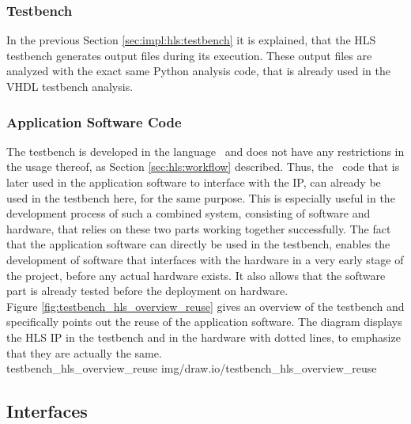 \subsubsection{Testbench}

In the previous Section \ref{sec:impl:hls:testbench} it is explained, that the HLS testbench generates output files during its execution.
These output files are analyzed with the exact same Python analysis code, that is already used in the VHDL testbench analysis.

\subsubsection{Application Software Code}

The testbench is developed in the language \cplusplus\ and does not have any restrictions in the usage thereof, as Section \ref{sec:hls:workflow} described.
Thus, the \cplusplus\ code that is later used in the application software to interface with the IP, can already be used in the testbench here, for the same purpose.
This is especially useful in the development process of such a combined system, consisting of software and hardware, that relies on these two parts working together successfully.
The fact that the application software can directly be used in the testbench, enables the development of software that interfaces with the hardware in a very early stage of the project, before any actual hardware exists.
It also allows that the software part is already tested before the deployment on hardware.\\

Figure \ref{fig:testbench_hls_overview_reuse} gives an overview of the testbench and specifically points out the reuse of the application software.
The diagram displays the HLS IP in the testbench and in the hardware with dotted lines, to emphasize that they are actually the same.\\

 {testbench_hls_overview_reuse} {img/draw.io/testbench_hls_overview_reuse}

\subsection{Interfaces}
\label{sec:impl:hls:interfaces}

